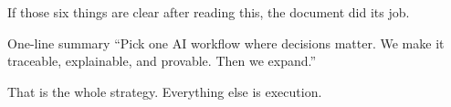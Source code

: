 If those six things are clear after reading this, the document did its job.

\begin{insightbox}{One-line summary}
\centering
\large ``Pick one AI workflow where decisions matter. We make it traceable, explainable, and provable. Then we expand.''
\end{insightbox}

That is the whole strategy.
Everything else is execution.
